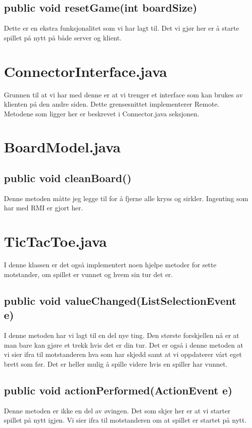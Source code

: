 \documentclass[11pt, a4paper]{article}	%
\begin{document}
\subsection*{public void resetGame(int boardSize) }
Dette er en ekstra funksjonalitet som vi har lagt til. Det vi gjør her er å starte spillet på nytt på både server og klient.

\section{ConnectorInterface.java}
Grunnen til at vi har med denne er at vi trenger et interface som kan brukes av klienten på den andre siden. Dette grensesnittet implementerer Remote. Metodene som ligger her er beskrevet i Connector.java seksjonen.

\section{BoardModel.java}
\subsection*{public void cleanBoard()}
Denne metoden måtte jeg legge til for å fjerne alle kryss og sirkler. Ingenting som har med RMI er gjort her.

\section{TicTacToe.java}
I denne klassen er det også implementert noen hjelpe metoder for sette motstander, om spillet er vunnet og hvem sin tur det er.
\subsection*{public void valueChanged(ListSelectionEvent e)}
I denne metoden har vi lagt til en del nye ting. Den største forskjellen nå er at man bare kan gjøre et trekk hvis det er din tur. Det er også i denne metoden at vi sier ifra til motstanderen hva som har skjedd samt at vi oppdaterer vårt eget brett som før. Det er heller mulig å spille videre hvis en spiller har vunnet.
\subsection*{public void actionPerformed(ActionEvent e)}
Denne metoden er ikke en del av øvingen. Det som skjer her er at vi starter spillet på nytt igjen. Vi sier ifra til motstanderen om at spillet er startet på nytt.
\end{document}
